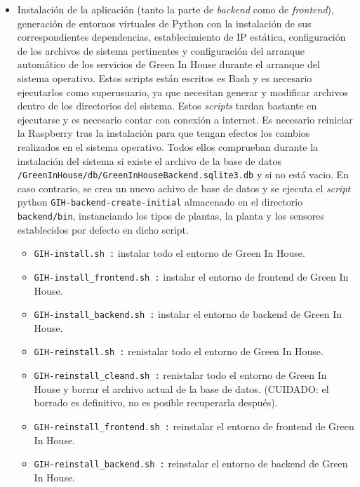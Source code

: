         \begin{itemize}    
            \item Instalación de la aplicación (tanto la parte de \textit{backend} como de \textit{frontend}), generación de entornos virtuales de Python con la instalación de sus correspondientes dependencias, establecimiento de IP estática, configuración de los archivos de sistema pertinentes y configuración del arranque automático de los servicios de Green In House durante el arranque del sistema operativo. Estos scripts están escritos es Bash y es necesario ejecutarlos como superusuario, ya que necesitan generar y modificar archivos dentro de los directorios del sistema. Estos \textit{scripts} tardan bastante en ejecutarse y es necesario contar con conexión a internet. Es necesario reiniciar la Raspberry tras la instalación para que tengan efectos los cambios realizados en el sistema operativo. Todos ellos comprueban durante la instalación del sistema si existe el archivo de la base de datos \texttt{/GreenInHouse/db/GreenInHouseBackend.sqlite3.db} y si no está vacio. En caso contrario, se crea un nuevo achivo de base de datos y se ejecuta el \textit{script} python \texttt{GIH-backend-create-initial} almacenado en el directorio \texttt{backend/bin}, instanciando los tipos de plantas, la planta y los sensores establecidos por defecto en dicho script.
            \begin{itemize}
                \item \texttt{GIH-install.sh :} instalar todo el entorno de Green In House. 
                \item \texttt{GIH-install\_frontend.sh :} instalar el entorno de frontend de Green In House.
                \item \texttt{GIH-install\_backend.sh :} instalar el entorno de backend de Green In House.
                \item \texttt{GIH-reinstall.sh :} renistalar todo el entorno de Green In House.
                \item \texttt{GIH-reinstall\_cleand.sh :} renistalar todo el entorno de Green In House y borrar el archivo actual de la base de datos. 
                \color{red}(CUIDADO: el borrado es definitivo, no es posible recuperarla después). \color{black}
                \item \texttt{GIH-reinstall\_frontend.sh :} reinstalar el entorno de frontend de Green In House.
                \item \texttt{GIH-reinstall\_backend.sh :} reinstalar el entorno de backend de Green In House.

\end{itemize}
\end{itemize}
